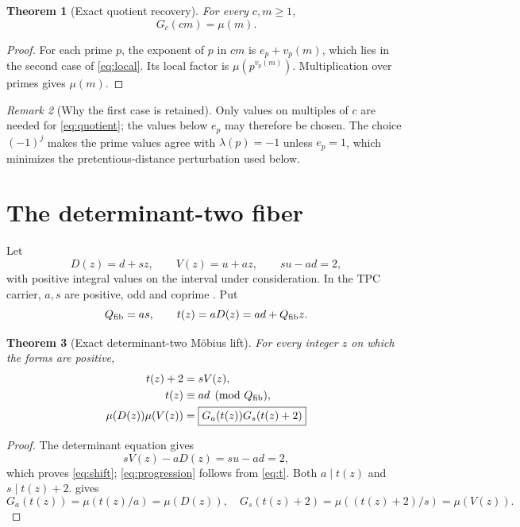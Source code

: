 \documentclass[11pt]{article}
\newtheorem{theorem}{Theorem}[section]
\theoremstyle{definition}
\theoremstyle{remark}
\newtheorem{remark}[theorem]{Remark}
\begin{document}
\begin{theorem}[Exact quotient recovery]
\label{thm:quotient}
For every \(c,m\ge1\),
\begin{equation}
 \boxed{G_c(cm)=\mu(m).}
\label{eq:quotient}
\end{equation}
\end{theorem}

\begin{proof}
For each prime \(p\), the exponent of \(p\) in \(cm\) is
\(e_p+v_p(m)\), which lies in the second case of
\eqref{eq:local}.  Its local factor is
\(\mu(p^{v_p(m)})\).  Multiplication over primes gives \(\mu(m)\).
\end{proof}

\begin{remark}[Why the first case is retained]
Only values on multiples of \(c\) are needed for
\eqref{eq:quotient}; the values below \(e_p\) may therefore be
chosen.  The choice \((-1)^j\) makes the prime values agree with
\(\lambda(p)=-1\) unless \(e_p=1\), which minimizes the
pretentious-distance perturbation used below.
\end{remark}

\section{The determinant-two fiber}

Let
\begin{equation}
 D(z)=d+sz,\qquad V(z)=u+az,\qquad su-ad=2,
\label{eq:fiber}
\end{equation}
with positive integral values on the interval under consideration.
In the TPC carrier, \(a,s\) are positive, odd and coprime
\citep{WangTPC127}.  Put
\begin{equation}
 Q_{\rm fib}=as,\qquad t(z)=aD(z)=ad+Q_{\rm fib}z.
\label{eq:t}
\end{equation}

\begin{theorem}[Exact determinant-two M\"obius lift]
\label{thm:fiber}
For every integer \(z\) on which the forms are positive,
\begin{align}
 t(z)+2&=sV(z),\label{eq:shift}\\
 t(z)&\equiv ad\pmod{Q_{\rm fib}},\label{eq:progression}\\
 \mu(D(z))\mu(V(z))
 &=\boxed{G_a(t(z))G_s(t(z)+2)}
\label{eq:fiber-lift}
\end{align}
\end{theorem}

\begin{proof}
The determinant equation gives
\[
 sV(z)-aD(z)=su-ad=2,
\]
which proves \eqref{eq:shift}; \eqref{eq:progression} follows from
\eqref{eq:t}.  Both \(a\mid t(z)\) and \(s\mid t(z)+2\).
 gives
\[
 G_a(t(z))=\mu(t(z)/a)=\mu(D(z)),
 \quad
 G_s(t(z)+2)=\mu((t(z)+2)/s)=\mu(V(z)).
\]
\end{proof}
\end{document}
